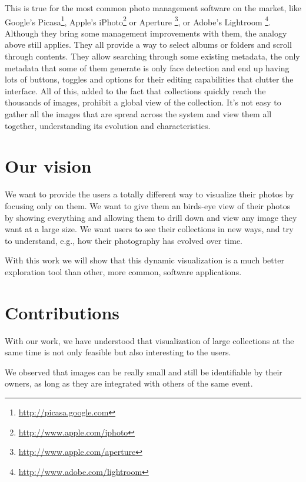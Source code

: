 This is true for the most common photo management software on the market, like Google's Picasa\footnote{\url{http://picasa.google.com}}, Apple's iPhoto\footnote{\url{http://www.apple.com/iphoto}} or Aperture \footnote{\url{http://www.apple.com/aperture}}, or Adobe's Lightroom \footnote{\url{http://www.adobe.com/lightroom}}. Although they bring some management improvements with them, the analogy above still applies. They all provide a way to select albums or folders and scroll through contents. They allow searching through some existing metadata, the only metadata that some of them generate is only face detection and end up having lots of buttons, toggles and options for their editing capabilities that clutter the interface. All of this, added to the fact that collections quickly reach the thousands of images, prohibit a global view of the collection. It's not easy to gather all the images that are spread across the system and view them all together, understanding its evolution and characteristics.

\section{Our vision} %
\label{ssub:our_vision}


We want to provide the users a totally different way to visualize their photos by focusing only on them. We want to give them an birds-eye view of their photos by showing everything and allowing them to drill down and view any image they want at a large size. We want users to see their collections in new ways, and try to understand, e.g., how their photography has evolved over time.

With this work we will show that this dynamic visualization is a much better exploration tool than other, more common, software applications.





\section{Contributions} %
\label{sec:contributions}

With our work, we have understood that visualization of large collections at the same time is not only feasible but also interesting to the users. 

We observed that images can be really small and still be identifiable by their owners, as long as they are integrated with others of the same event.

